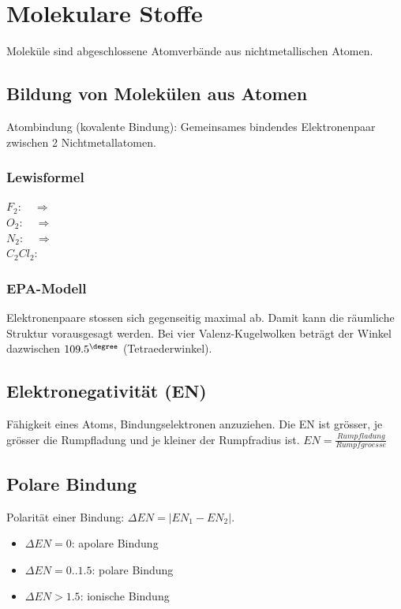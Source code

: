 \section{Molekulare Stoffe}
Moleküle sind abgeschlossene Atomverbände aus nichtmetallischen Atomen. 

\subsection{Bildung von Molekülen aus Atomen}
Atombindung (kovalente Bindung): Gemeinsames bindendes Elektronenpaar zwischen 2 Nichtmetallatomen. 

\subsubsection{Lewisformel}
\begin{multicols}{2}
$F_2$: \   $\Rightarrow$   \\
$O_2$: \  $\Rightarrow$  \\
$N_2$: \  $\Rightarrow$  \\
$C_2Cl_2$: \ 
\end{multicols}

\subsubsection{EPA-Modell}
Elektronenpaare stossen sich gegenseitig maximal ab. Damit kann die räumliche Struktur vorausgesagt werden. Bei vier Valenz-Kugelwolken beträgt der Winkel dazwischen $109.5^\degree$ (Tetraederwinkel).

\subsection{Elektronegativität (EN)}
Fähigkeit eines Atoms, Bindungselektronen anzuziehen. Die EN ist grösser, je grösser die Rumpfladung und je kleiner der Rumpfradius ist. $EN=\frac{Rumpfladung}{Rumpfgroesse}$

\subsection{Polare Bindung}
Polarität einer Bindung: $\Delta EN = | EN_{1} - EN_{2} |$. 
\begin{itemize}
	\item $\Delta EN = 0$: apolare Bindung
	\item $\Delta EN = 0 .. 1.5$: polare Bindung
	\item $\Delta EN > 1.5$: ionische Bindung
\end{itemize}


